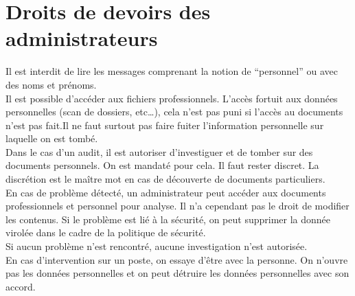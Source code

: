\section{Droits de devoirs des administrateurs}
Il est interdit de lire les messages comprenant la notion de \enquote{personnel} ou avec des noms et prénoms.\\
Il est possible d'accéder aux fichiers professionnels. L'accès fortuit aux données personnelles (scan de dossiers, etc\ldots), cela n'est pas puni si l'accès au documents n'est pas fait.Il ne faut surtout pas faire fuiter l'information personnelle sur laquelle on est tombé.\\
Dans le cas d'un audit, il est autoriser d'investiguer et de tomber sur des documents personnels. On est mandaté pour cela. Il faut rester discret. La discrétion est le maître mot en cas de découverte de documents particuliers.\\
En cas de problème détecté, un administrateur peut accéder aux documents professionnels et personnel pour analyse. Il n'a cependant pas le droit de modifier les contenus. Si le problème est lié à la sécurité, on peut supprimer la donnée virolée dans le cadre de la politique de sécurité.\\
Si aucun problème n'est rencontré, aucune investigation n'est autorisée.\\
En cas d'intervention sur un poste, on essaye d'être avec la personne. On n'ouvre pas les données personnelles et on peut détruire les données personnelles avec son accord.